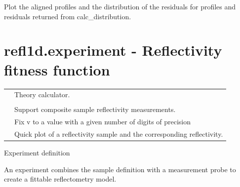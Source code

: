 \documentclass[letterpaper,10pt,english]{sphinxmanual}
\begin{document}

\begin{fulllineitems}
\label{api/errors:refl1d.errors.show_distribution}
Plot the aligned profiles and the distribution of the residuals for
profiles and residuals returned from calc\_distribution.

\end{fulllineitems}



\section{refl1d.experiment - Reflectivity fitness function}
\label{api/experiment:refl1d-experiment-reflectivity-fitness-function}\label{api/experiment::doc}
\begin{tabulary}{\linewidth}{LL}
\hline

{\hyperref[api/experiment:refl1d.experiment.Experiment]{}}
 & 
Theory calculator.
\\

{\hyperref[api/experiment:refl1d.experiment.ExperimentBase]{}}
 & 

\\

{\hyperref[api/experiment:refl1d.experiment.MixedExperiment]{}}
 & 
Support composite sample reflectivity measurements.
\\

{\hyperref[api/experiment:refl1d.experiment.nice]{}}
 & 
Fix v to a value with a given number of digits of precision
\\

{\hyperref[api/experiment:refl1d.experiment.plot_sample]{}}
 & 
Quick plot of a reflectivity sample and the corresponding reflectivity.
\\
\hline
\end{tabulary}

\label{api/experiment:module-refl1d.experiment}
Experiment definition

An experiment combines the sample definition with a measurement probe
to create a fittable reflectometry model.
\end{document}
